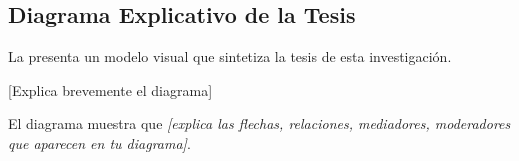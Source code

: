 \subsection{Diagrama Explicativo de la Tesis}
\label{subsec:diagrama_tesis}

La  presenta un modelo visual que sintetiza la tesis de esta investigación.



{[Explica brevemente el diagrama]}

El diagrama muestra que \textit{{[explica las flechas, relaciones, mediadores, moderadores que aparecen en tu diagrama]}}.

%
%

